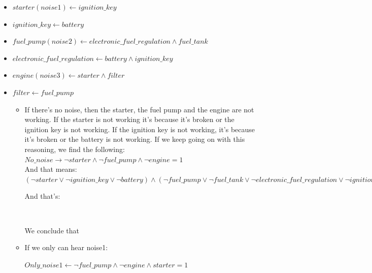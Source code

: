 \documentclass[paper=a4, fontsize=11pt]{scrartcl} %
\numberwithin{equation}{section} %
\numberwithin{figure}{section} %
\numberwithin{table}{section} %
\begin{document}
\begin{itemize}

	\item $ starter(noise1) \leftarrow ignition\_key $
	\item $ ignition\_key \leftarrow battery $
	
	\item $ fuel\_pump(noise2) \leftarrow electronic\_fuel\_regulation \land fuel\_tank $					
	\item $ electronic\_fuel\_regulation \leftarrow battery \land ignition\_key $
			

	\item $ engine(noise3) \leftarrow starter \land filter $
	\item $ filter \leftarrow fuel\_pump $
	
	
	\begin{itemize}		
		\item If there's no noise, then the starter, the fuel pump and the engine are not working. If the starter is not working it's because it's broken or the ignition key is not working. If the ignition key is not working, it's because it's broken or the battery is not working. If we keep going on with this reasoning, we find the following:\\
		
		$ No\_noise \rightarrow \lnot starter \land \lnot fuel\_pump \land \lnot engine = 1 $\\
		
		And that means: \\
		
		$ (\lnot starter \lor \lnot ignition\_key \lor \lnot battery) \land (\lnot fuel\_pump \lor \lnot fuel\_tank \lor \lnot electronic\_fuel\_regulation \lor \lnot ignition\_key \lor \lnot battery) \land (\lnot engine \lor \lnot filter \lor \lnot fuel\_pump \lor \lnot fuel\_tank \lor \lnot electronic\_fuel\_regulation \lor \lnot ignition\_key \lor \lnot battery \lor \lnot starter \lor \lnot ignition\_key \lor \lnot battery) = 1 $
		
		And that's:
		
		$  $
		
		We conclude that 
		
		
		
		
		
		\item If we only can hear noise1:
		
		$ Only\_noise1 \leftarrow  \lnot fuel\_pump \land \lnot engine \land starter = 1 $\\
		

\end{itemize}
\end{itemize}
\end{document}
